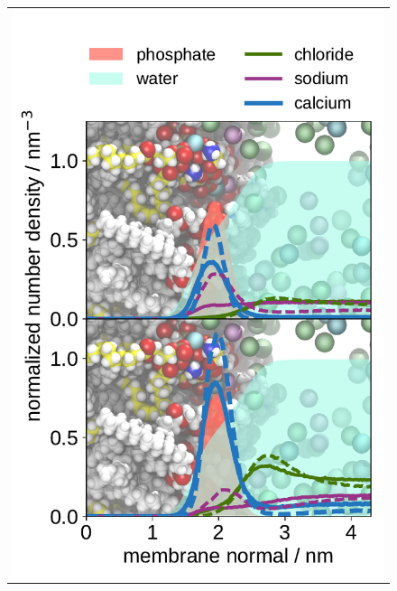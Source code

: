 \documentclass[journal=jpcbfk,manuscript=article]{achemso}
\newlength{\figheightsmall}
\newlength{\figheight}
\begin{document}

\begin{figure}[tbp!] 
  \centering 
  \begin{tabular}{ c }
  \includegraphics[height=\figheightsmall]{../img/ecc_pops/density_profiles_ca_na_k_cl_wat_phos_ecclipids_lipid17_compar_80and200mMCaCl2.pdf}

\end{tabular}
\end{figure}
\end{document}
